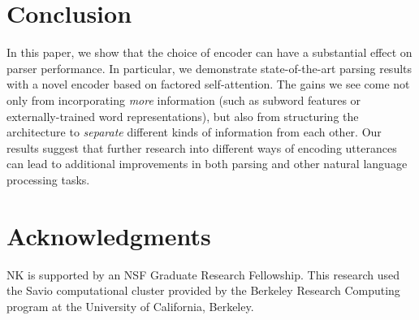 \documentclass[11pt,a4paper]{article}
\begin{document}
\section{Conclusion}

In this paper, we show that the choice of encoder can have a substantial effect on parser performance.  In particular, we demonstrate state-of-the-art parsing results with a novel encoder based on factored self-attention. The gains we see come not only from incorporating \emph{more} information (such as subword features or externally-trained word representations), but also from structuring the architecture to \emph{separate} different kinds of information from each other. Our results suggest that further research into different ways of encoding utterances can lead to additional improvements in both parsing and other natural language processing tasks.

\section*{Acknowledgments}

NK is supported by an NSF Graduate Research Fellowship. This research used the Savio computational cluster provided by the Berkeley Research Computing program at the University of California, Berkeley.






\appendix
\newpage
\phantom{No text here}
\end{document}
